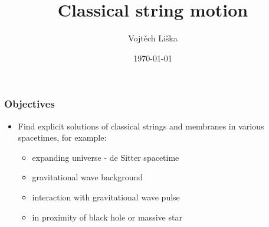 \documentclass[aspectratio=43,serif]{beamer}
\title[Classical string motion]{Classical string motion} %
\author{Vojtěch Liška} %
\institute[PřF MUNI] %
{
Masaryk University, Faculty of Science \\ %
\medskip
\tiny{Supervisor: prof. Rikard von Unge}
}
\date{\today} %
\begin{document}
\begin{frame}[plain]
	\titlepage %
\end{frame}







\begin{frame}
	\frametitle{Objectives}
	\begin{itemize}
		\item Find explicit solutions of classical strings and membranes in various spacetimes, for example:
		\begin{itemize}
			\item expanding universe - de Sitter spacetime
			\item gravitational wave background
			\item interaction with gravitational wave pulse
			\item in proximity of black hole or massive star
		\end{itemize}
	\end{itemize}

\end{frame}
\end{document}
